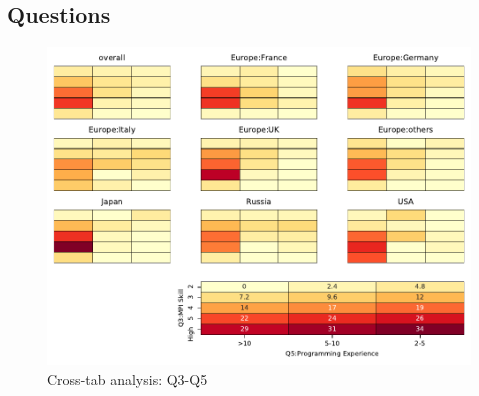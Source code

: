 
\subsection{Questions}


\begin{figure}
\begin{center}
\includegraphics[width=12cm]{../pdfs/Q3-Q5.pdf}
\caption{Cross-tab analysis: Q3-Q5}
\label{fig:Q3-Q5}
\end{center}
\end{figure}

